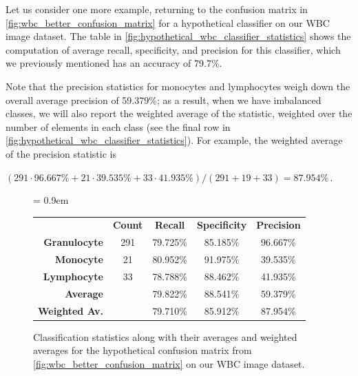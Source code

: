 \begin{qbox}\end{qbox}

Let us consider one more example, returning to the confusion matrix in \autoref{fig:wbc_better_confusion_matrix} for a hypothetical classifier on our WBC image dataset. The table in \autoref{fig:hypothetical_wbc_classifier_statistics} shows the computation of average recall, specificity, and precision for this classifier, which we previously mentioned has an accuracy of 79.7\%.

Note that the precision statistics for monocytes and lymphocytes weigh down the overall average precision of 59.379\%; as a result, when we have imbalanced classes, we will also report the weighted average of the statistic, weighted over the number of elements in each class (see the final row in \autoref{fig:hypothetical_wbc_classifier_statistics}). For example, the weighted average of the precision statistic is

\begin{center}
$(291 \cdot 96.667\% + 21 \cdot 39.535\% + 33 \cdot 41.935\%)/(291+19+33) = 87.954\%$\,.
\end{center}

\begin{figure}[h]
\centering
\tabcolsep = 0.9em
\mySfFamily
{}
\begin{tabular}{r c c c c}
\rowcolor{gray!50}
& \textbf{Count} & \textbf{Recall} & \textbf{Specificity} & \textbf{Precision} \\
\textbf{Granulocyte} & 291 & 79.725\% & 85.185\% & 96.667\%\\
\textbf{Monocyte} & \phantom{2}21 & 80.952\% & 91.975\% & 39.535\% \\
\textbf{Lymphocyte} & \phantom{2}33 & 78.788\% & 88.462\% & 41.935\%\\
\textbf{Average} & & 79.822\% & 88.541\% & 59.379\%\\
\textbf{Weighted Av.} & & 79.710\% & 85.912\% & 87.954\%\\
\end{tabular}
\caption{Classification statistics along with their averages and weighted averages for the hypothetical confusion matrix from \autoref{fig:wbc_better_confusion_matrix} on our WBC image dataset.}
\label{fig:hypothetical_wbc_classifier_statistics}
\end{figure}

